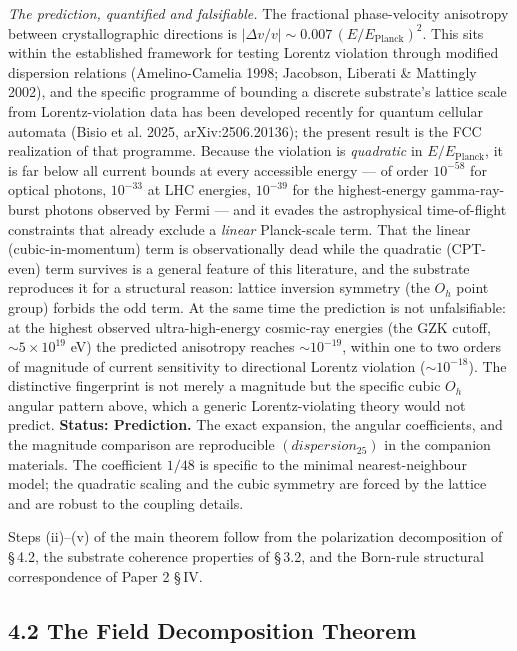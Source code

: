 \documentclass[11pt,oneside]{report}
\theoremstyle{definition}
\theoremstyle{remark}
\begin{document}
\emph{The prediction, quantified and falsifiable.} The fractional phase-velocity
anisotropy between crystallographic directions is
\ensuremath{|\Delta v/v| \sim 0.007\,(E/E_{\mathrm{Planck}})^{2}}. This sits within the
established framework for testing Lorentz violation through modified dispersion
relations (Amelino-Camelia 1998; Jacobson, Liberati \& Mattingly 2002), and the
specific programme of bounding a discrete substrate's lattice scale from
Lorentz-violation data has been developed recently for quantum cellular automata
(Bisio et al. 2025, arXiv:2506.20136); the present result is the FCC realization
of that programme. Because the violation is \emph{quadratic} in
\ensuremath{E/E_{\mathrm{Planck}}}, it is far below all current bounds at
every accessible energy --- of order \ensuremath{10^{-58}} for optical photons, \ensuremath{10^{-33}} at
LHC energies, \ensuremath{10^{-39}} for the highest-energy gamma-ray-burst photons observed
by Fermi --- and it evades the astrophysical time-of-flight constraints that
already exclude a \emph{linear} Planck-scale term. That the linear (cubic-in-momentum)
term is observationally dead while the quadratic (CPT-even) term survives is a
general feature of this literature, and the substrate reproduces it for a
structural reason: lattice inversion symmetry (the \ensuremath{O_{h}} point group) forbids the
odd term. At the same time the prediction is not
unfalsifiable: at the highest observed ultra-high-energy cosmic-ray energies
(the GZK cutoff, \ensuremath{\sim 5\times10^{19}} eV) the predicted anisotropy reaches
\ensuremath{\sim 10^{-19}}, within one to two orders of magnitude of current sensitivity to
directional Lorentz violation (\ensuremath{\sim 10^{-18}}). The distinctive fingerprint is not
merely a magnitude but the specific cubic \ensuremath{O_{h}} angular pattern above, which a
generic Lorentz-violating theory would not predict. \textbf{Status: Prediction.}
The exact expansion, the angular coefficients, and the magnitude comparison are
reproducible \ensuremath{(dispersion_{25})} in the companion materials. The coefficient
\ensuremath{1/48} is specific to the minimal nearest-neighbour model; the quadratic scaling
and the cubic symmetry are forced by the lattice and are robust to the coupling
details.

Steps (ii)--(v) of the main theorem follow from the polarization
decomposition of \S\,4.2, the substrate coherence properties of \S\,3.2, and
the Born-rule structural correspondence of Paper 2 \S\,IV.

\subsection*{4.2 The Field Decomposition Theorem}
\end{document}
